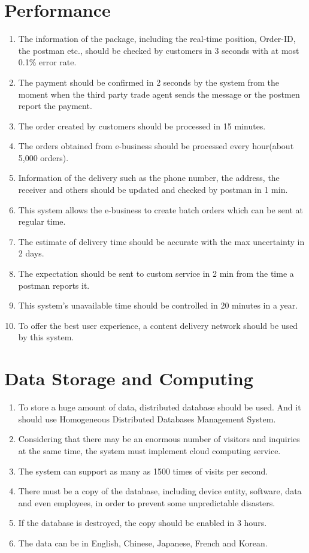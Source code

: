 \documentclass[12pt]{scrreprt}
\begin{document}
\section{Performance}
\begin{enumerate}
  \item The information of the package, including the real-time position,
  Order-ID, the postman etc., should be checked by customers in 3 seconds
  with at most 0.1\% error rate.
  \item The payment should be confirmed in 2 seconds by the system from
  the moment when the third party trade agent sends the message or the
  postmen report the payment.
  \item The order created by customers should be processed in 15 minutes.
  \item The orders obtained from e-business should be processed every
  hour(about 5,000 orders).
  \item Information of the delivery such as the phone number, the address,
  the receiver and others should be updated and checked by postman in 1 min.
  \item This system allows the e-business to create batch orders which can
  be sent at regular time.
  \item The estimate of delivery time should be accurate with the max
  uncertainty in 2 days.
  \item The expectation should be sent to custom service in 2 min from
  the time a postman reports it.
  \item This system’s unavailable time should be controlled in 20 minutes
  in a year.
  \item To offer the best user experience, a content delivery network
  should be used by this system.
\end{enumerate}

\section{Data Storage and Computing}
\begin{enumerate}
  \item To store a huge amount of data, distributed database should be used.
  And it should use Homogeneous Distributed Databases Management System.
  \item Considering that there may be an enormous number of visitors and
  inquiries at the same time, the system must implement cloud computing service.
  \item The system can support as many as 1500 times of visits per second.
  \item There must be a copy of the database, including device entity,
  software, data and even employees, in order to prevent some unpredictable
  disasters.
  \item If the database is destroyed, the copy should be enabled in 3 hours.
  \item The data can be in English, Chinese, Japanese, French and Korean.
\end{enumerate}
\end{document}
